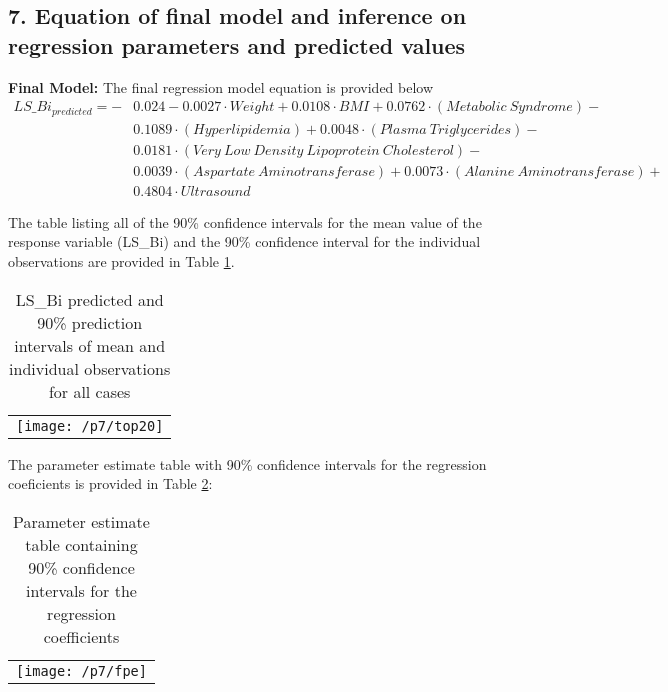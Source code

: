 \documentclass{article}
\begin{document}
\subsection{7. Equation of final model and inference on regression parameters and predicted values}
\textbf{Final Model:} The final regression model equation is provided below
\begin{align*}
LS\_Bi_{predicted} = - & 0.024 - 0.0027 \cdot Weight + 0.0108 \cdot BMI + 0.0762 \cdot (Metabolic\ Syndrome) - \\ &0.1089 \cdot (Hyperlipidemia) + 0.0048 \cdot (Plasma\ Triglycerides) -\\ &0.0181 \cdot (Very\ Low\ Density\ Lipoprotein\ Cholesterol) - \\ &0.0039 \cdot (Aspartate\ Aminotransferase) + 0.0073 \cdot (Alanine\ Aminotransferase) + \\ &0.4804 \cdot Ultrasound
\end{align*}

The table listing all of the 90\% confidence intervals for the mean value of the response variable (LS\_Bi) and the 90\% confidence interval for the individual observations are provided in Table \ref{predv}.\\

\begin{table}[H]
\centering
\caption{\small LS\_Bi predicted and 90\% prediction intervals of mean and individual observations for all cases} \label{predv} 
\begin{tabular}{c}
\begin{minipage}{\textwidth}
\centering
\texttt{[image: /p7/top20]}
\end{minipage}
\end{tabular}
\end{table}

The parameter estimate table with 90\% confidence intervals for the regression coeficients is provided in Table \ref{finalpe}:

\begin{table}[H]
\centering
\caption{\small Parameter estimate table containing 90\% confidence intervals for the regression coefficients} \label{finalpe} 
\begin{tabular}{c}
\begin{minipage}{\textwidth}
\centering
\texttt{[image: /p7/fpe]}
\end{minipage}
\end{tabular}
\end{table}
\end{document}
